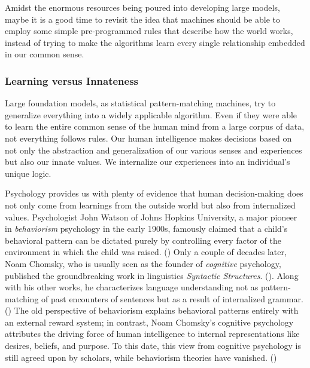 \documentclass[12pt]{article}
\begin{document}
Amidst the enormous resources being poured into developing large models, maybe it is a good time to revisit the idea that machines should be able to employ some simple pre-programmed rules that describe how the world works, instead of trying to make the algorithms learn every single relationship embedded in our common sense. 

\subsubsection{Learning versus Innateness}
Large foundation models, as statistical pattern-matching machines, try to generalize everything into a widely applicable algorithm. Even if they were able to learn the entire common sense of the human mind from a large corpus of data, not everything follows rules. Our human intelligence makes decisions based on not only the abstraction and generalization of our various senses and experiences but also our innate values. We internalize our experiences into an individual's unique logic.

Psychology provides us with plenty of evidence that human decision-making does not only come from learnings from the outside world but also from internalized values. Psychologist John Watson of Johns Hopkins University, a major pioneer in \textit{behaviorism} psychology in the early 1900s, famously claimed that a child's behavioral pattern can be dictated purely by controlling every factor of the environment in which the child was raised. (\cite{behaviorism}) Only a couple of decades later, Noam Chomsky, who is usually seen as the founder of \textit{cognitive} psychology, published the groundbreaking work in linguistics \textit{Syntactic Structures}. (\cite{noamchomskylinguistic}). Along with his other works, he characterizes language understanding not as pattern-matching of past encounters of sentences but as a result of internalized grammar. (\cite{597748ff-2020-3c20-9c06-e358280e09a2}) The old perspective of behaviorism explains behavioral patterns entirely with an external reward system; in contrast, Noam Chomsky's cognitive psychology attributes the driving force of human intelligence to internal representations like desires, beliefs, and purpose. To this date, this view from cognitive psychology is still agreed upon by scholars, while behaviorism theories have vanished. (\cite{reboot})
\end{document}
